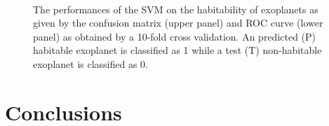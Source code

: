 \documentclass[
12pt, %
a4paper, %
oneside, %
headinclude,footinclude, %
BCOR5mm, %
]{scrartcl}
\begin{document}
\begin{figure}[h]
  \centering
{}\\
\caption{The performances of the SVM on the habitability of exoplanets as given by the confusion matrix (upper panel) and ROC curve (lower panel) as obtained by a 10-fold cross validation. An predicted (P) habitable exoplanet is classified as 1 while a test (T) non-habitable exoplanet is classified as 0.}
\label{SVM_results}
\end{figure}







\clearpage

\section{Conclusions}
\end{document}
